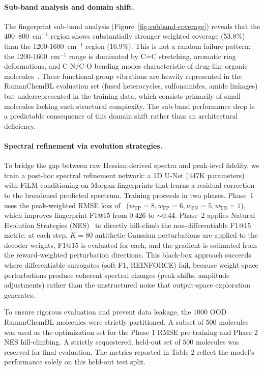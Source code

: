 \documentclass[10pt]{article}
\begin{document}
\paragraph{Sub-band analysis and domain shift.} The fingerprint sub-band analysis (Figure~\ref{fig:subband-coverage}) reveals that the 400--800~cm$^{-1}$ region shows substantially stronger weighted coverage (53.8\%) than the 1200-1600~cm$^{-1}$ region (16.9\%). This is not a random failure pattern: the 1200-1600~cm$^{-1}$ range is dominated by C=C stretching, aromatic ring deformations, and C-N/C-O bending modes characteristic of drug-like organic molecules~\citep{long2002raman}. These functional-group vibrations are heavily represented in the RamanChemBL evaluation set (fused heterocycles, sulfonamides, amide linkages) but underrepresented in the training data, which consists primarily of small molecules lacking such structural complexity. The sub-band performance drop is a predictable consequence of this domain shift rather than an architectural deficiency.

\paragraph{Spectral refinement via evolution strategies.} To bridge the gap between raw Hessian-derived spectra and peak-level fidelity, we train a post-hoc spectral refinement network: a 1D U-Net (447K parameters) with FiLM conditioning on Morgan fingerprints that learns a residual correction to the broadened predicted spectrum. Training proceeds in two phases. Phase~1 uses the peak-weighted RMSE loss of~\citet{sorrentino2025mol2raman} ($w_{\mathrm{TP}} = 8, w_{\mathrm{FP}} = 6, w_{\mathrm{FN}} = 5, w_{\mathrm{TN}} = 1$), which improves fingerprint F1@15 from 0.426 to ${\sim}$0.44. Phase~2 applies Natural Evolution Strategies (NES)~\citep{salimans2017evolutionstrategiesscalablealternative} to directly hill-climb the non-differentiable F1@15 metric: at each step, $K{=}80$ antithetic Gaussian perturbations are applied to the decoder weights, F1@15 is evaluated for each, and the gradient is estimated from the reward-weighted perturbation directions. This black-box approach succeeds where differentiable surrogates (soft-F1, REINFORCE) fail, because weight-space perturbations produce coherent spectral changes (peak shifts, amplitude adjustments) rather than the unstructured noise that output-space exploration generates.

To ensure rigorous evaluation and prevent data leakage, the $1000$ OOD RamanChemBL molecules were strictly partitioned. A subset of $500$ molecules was used as the optimization set for the Phase 1 RMSE pre-training and Phase 2 NES hill-climbing. A strictly sequestered, held-out set of $500$ molecules was reserved for final evaluation. The metrics reported in Table 2 reflect the model's performance solely on this held-out test split.
\end{document}
